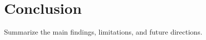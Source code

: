 \section{Conclusion}
\label{sec:conclusion}

Summarize the main findings, limitations, and future directions.
